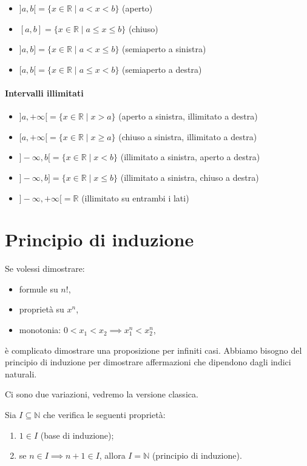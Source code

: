 \documentclass[oneside,10pt]{book} %
\begin{document}
\begin{itemize}
  \item $]a,b[ = \{ x \in \mathbb{R} \mid a < x < b \}$ (aperto)
  \item $[a,b] = \{ x \in \mathbb{R} \mid a \le x \le b \}$ (chiuso)
  \item $]a,b] = \{ x \in \mathbb{R} \mid a < x \le b \}$ (semiaperto a sinistra)
  \item $[a,b[ = \{ x \in \mathbb{R} \mid a \le x < b \}$ (semiaperto a destra)
\end{itemize}

\paragraph{Intervalli illimitati}

\begin{itemize}
  \item $]a, +\infty[ = \{ x \in \mathbb{R} \mid x > a \}$ (aperto a sinistra, illimitato a destra)
  \item $[a, +\infty[ = \{ x \in \mathbb{R} \mid x \ge a \}$ (chiuso a sinistra, illimitato a destra)
  \item $]-\infty, b[ = \{ x \in \mathbb{R} \mid x < b \}$ (illimitato a sinistra, aperto a destra)
  \item $]-\infty, b] = \{ x \in \mathbb{R} \mid x \le b \}$ (illimitato a sinistra, chiuso a destra)
  \item $]-\infty, +\infty[ = \mathbb{R}$ (illimitato su entrambi i lati)
\end{itemize}

\section{Principio di induzione}
Se volessi dimostrare:
\begin{itemize}
\item formule su $n!$,
\item proprietà su $x^n$,
\item monotonia: $0 < x_1 < x_2 \implies x_1^n < x_2^n$,
\end{itemize}

è complicato dimostrare una proposizione per infiniti casi.
Abbiamo bisogno del principio di induzione per dimostrare affermazioni che dipendono dagli indici naturali.

Ci sono due variazioni, vedremo la versione classica.

Sia $I \subseteq \mathbb{N}$ che verifica le seguenti proprietà:
\begin{enumerate}
\item $1 \in I$ (base di induzione);
\item se $n \in I \implies n+1 \in I$, allora $I = \mathbb{N}$ (principio di induzione).
\end{enumerate}
\end{document}
